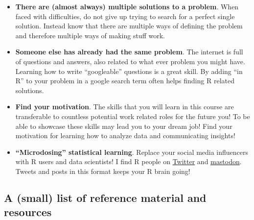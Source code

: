 \documentclass[
  11pt,
  letterpaper,
]{scrbook}
\providecommand{\tightlist}{%
  \setlength{\itemsep}{0pt}\setlength{\parskip}{0pt}}\usepackage{longtable,booktabs,array}
\begin{document}
\begin{itemize}
\tightlist
\item
  \textbf{There are (almost always) multiple solutions to a problem}.
  When faced with difficulties, do not give up trying to search for a
  perfect single solution. Instead know that there are multiple ways of
  defining the problem and therefore multiple ways of making stuff work.
\item
  \textbf{Someone else has already had the same problem}. The internet
  is full of questions and answers, also related to what ever problem
  you might have. Learning how to write ``googleable'' questions is a
  great skill. By adding ``in R'' to your problem in a google search
  term often helps finding R related solutions.
\item
  \textbf{Find your motivation}. The skills that you will learn in this
  course are transferable to countless potential work related roles for
  the future you! To be able to showcase these skills may lead you to
  your dream job! Find your motivation for learning how to analyze data
  and communicating insights!
\item
  \textbf{``Microdosing'' statistical learning}. Replace your social
  media influencers with R users and data scientists! I find R people on
  \href{twitter.com}{Twitter} and
  \href{https://joinmastodon.org/}{mastodon}. Tweets and posts in this
  format keeps your R brain going!
\end{itemize}

\hypertarget{a-small-list-of-reference-material-and-resources}{%
\subsection{A (small) list of reference material and
resources}\label{a-small-list-of-reference-material-and-resources}}
\end{document}

